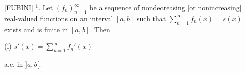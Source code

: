 [FUBINI] $^1$. Let $(f_n)_{n=1}^{\infty}$ be a sequence of nondecreasing [or nonincreasing] real-valued functions on an interval $[a, b]$ such that $\sum_{n=1}^{\infty} f_n(x) = s(x)$ exists and is finite in $[a, b]$. Then

(i) $s'(x) = \sum_{n=1}^{\infty} f_n'(x)$

a.e. in $]a, b[$.